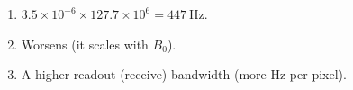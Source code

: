 \begin{enumerate}[leftmargin=1.6em,itemsep=2pt]
\item $3.5\times10^{-6}\times127.7\times10^{6} = 447\ \text{Hz}$.
\item Worsens (it scales with $B_0$).
\item A higher readout (receive) bandwidth (more Hz per pixel).
\end{enumerate}
